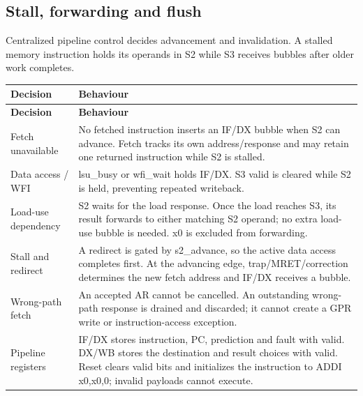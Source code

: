 \documentclass[11pt]{article}
\begin{document}
\subsection{Stall, forwarding and flush}
\noindent Centralized pipeline control decides advancement and invalidation. A stalled memory instruction holds its operands in S2 while S3 receives bubbles after older work completes.\par\medskip
{\small
\begin{longtable}{@{}L{0.2500\dimexpr\linewidth-12pt\relax}L{0.7500\dimexpr\linewidth-12pt\relax}@{}}
\toprule
\textbf{Decision} & \textbf{Behaviour} \\ \midrule
\endfirsthead
\toprule
\textbf{Decision} & \textbf{Behaviour} \\ \midrule
\endhead
Fetch unavailable & No fetched instruction inserts an IF/DX bubble when S2 can advance. Fetch tracks its own address/response and may retain one returned instruction while S2 is stalled. \\ \addlinespace[3pt]
Data access / WFI & lsu\_busy or wfi\_wait holds IF/DX. S3 valid is cleared while S2 is held, preventing repeated writeback. \\ \addlinespace[3pt]
Load-use dependency & S2 waits for the load response. Once the load reaches S3, its result forwards to either matching S2 operand; no extra load-use bubble is needed. x0 is excluded from forwarding. \\ \addlinespace[3pt]
Stall and redirect & A redirect is gated by s2\_advance, so the active data access completes first. At the advancing edge, trap/MRET/correction determines the new fetch address and IF/DX receives a bubble. \\ \addlinespace[3pt]
Wrong-path fetch & An accepted AR cannot be cancelled. An outstanding wrong-path response is drained and discarded; it cannot create a GPR write or instruction-access exception. \\ \addlinespace[3pt]
Pipeline registers & IF/DX stores instruction, PC, prediction and fault with valid. DX/WB stores the destination and result choices with valid. Reset clears valid bits and initializes the instruction to ADDI x0,x0,0; invalid payloads cannot execute. \\*
\bottomrule\end{longtable}}

\end{document}
